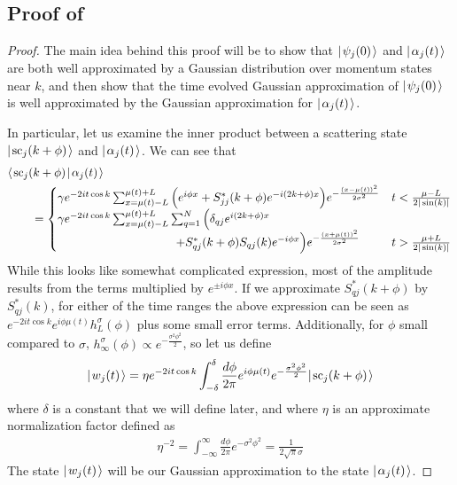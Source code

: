 \documentclass[../thesis-main/thesis-main]{subfiles}
\begin{document}
\subsection{Proof of }


\begin{proof}



The main idea behind this proof will be to show that $|\mspace{2mu} \psi_j(0) \mspace{2mu} \rangle$ and $|\mspace{2mu} \alpha_j(t) \mspace{2mu} \rangle$ are both well approximated by a Gaussian distribution over momentum states near $k$, and then show that the time evolved Gaussian approximation of $|\mspace{2mu} \psi_j(0) \mspace{2mu} \rangle$ is well approximated by the Gaussian approximation for $|\mspace{2mu} \alpha_j(t) \mspace{2mu} \rangle$.  

In particular, let us examine the inner product between a scattering state $|\mspace{2mu} \text{sc}_j(k+\phi) \mspace{2mu} \rangle$ and $|\mspace{2mu} \alpha_j(t) \mspace{2mu} \rangle$.  We can see that
\begin{align}
  &\langle\mspace{2mu} \text{sc}_j(k+\phi) \mspace{2mu} | \mspace{2mu} \alpha_j(t)\mspace{2mu} \rangle\nonumber\\
  &\qquad= \begin{cases} 
      \gamma e^{-2 i t \cos k} \sum_{x=\mu(t)-L}^{\mu(t)+L} \Big(e^{i \phi x} + S_{jj}^*(k+\phi) e^{-i(2k + \phi)x}\Big) e^{ -\frac{(x-\mu(t))^2}{2\sigma^2}}
        & t < \frac{\mu - L}{2|\sin(k)|}\\
      \gamma e^{-2 i t \cos k} \sum_{x=\mu(t)-L}^{\mu(t)+L} \sum_{q=1}^N \Big(\delta_{qj} e^{i (2k+\phi) x}\\
      \qquad \qquad \qquad \qquad\qquad  + S_{qj}^*(k+\phi) S_{qj}(k) e^{-i\phi x}\Big) e^{ -\frac{(x+\mu(t))^2}{2\sigma^2}}& t > \frac{\mu + L}{2|\sin(k)|}
      \end{cases} 
 \end{align}
While this looks like somewhat complicated expression, most of the amplitude results from the terms multiplied by $e^{\pm i \phi x}$.  If we approximate $S_{qj}^*(k+\phi)$ by $S_{qj}^*(k)$, for either of the time ranges the above expression can be seen as $e^{-2it \cos k} e^{ i \phi \mu(t)} h_L^\sigma(\phi)$ plus some small error terms.  Additionally, for $\phi$ small compared to $\sigma$, $h_\infty^\sigma(\phi) \propto e^{-\frac{\sigma^2\phi^2}{2}}$,  so let us define
\begin{align}
  |\mspace{2mu} w_j(t) \mspace{2mu} \rangle = \eta e^{- 2 i t \cos k}\int_{-\delta}^{\delta} \frac{d\phi}{2\pi} e^{ i \phi \mu(t)} e^{-\frac{\sigma^2\phi^2}{2}}|\mspace{2mu} \text{sc}_{j}(k+\phi) \mspace{2mu} \rangle \label{eq:gaussian_w_defn}
\end{align}
where $\delta$ is a constant that we will define later, and where $\eta$ is an approximate normalization factor defined as
\begin{align}
  \eta^{-2} = \int_{-\infty}^{\infty} \frac{d\phi}{2\pi} e^{-\sigma^2\phi^2} = \frac{1}{2 \sqrt{\pi} \sigma}
\end{align}
The state $|\mspace{2mu} w_j(t) \mspace{2mu} \rangle$ will be our Gaussian approximation to the state $|\mspace{2mu} \alpha_j(t) \mspace{2mu} \rangle$.  


\end{proof}
\end{document}
